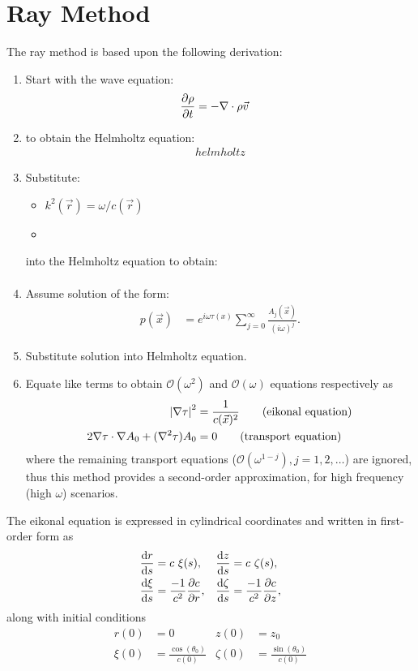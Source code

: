\chapter{Ray Method}
The ray method is based upon the following derivation:
\begin{enumerate}
	\item Start with the wave equation:
	\begin{align}
		\pdv{\rho}{t} &= -\nabla \cdot \rho \vec{v}
	\end{align}

	\item  to obtain the Helmholtz equation:
	\begin{align}
		helmholtz
	\end{align}

	\item Substitute:
	\begin{itemize}
		\item $k^2(\vec{r}) = \omega / c(\vec{r})$
		\item 
	\end{itemize}
	into the Helmholtz equation to obtain:
	\begin{align}
		\tag{TODO}
	\end{align}

	\item Assume solution of the form:
	\begin{align}
		p(\vec{x}) &= e^{i\omega\tau(x)} \sum_{j=0}^\infty \frac{A_j(\vec{x})}{(i\omega)^j}.
	\end{align}

	\item Substitute solution into Helmholtz equation.

	\item Equate like terms to obtain $\mathcal{O}(\omega^2)$ and $\mathcal{O}(\omega)$ equations respectively as
	\begin{align}
		{ \left| {\nabla\tau} \right| }^2 &= \frac{1}{c(\vec{x})^2} \tag{eikonal equation} \\
		2\nabla\tau \cdot \nabla{A_0} + (\nabla^2\tau) A_0 &= 0 \tag{transport equation}
	\end{align}
	where the remaining transport equations ($\mathcal{O}(\omega^{1-j}), j = 1, 2, \dots$) are ignored, thus this method provides a second-order approximation, for high frequency (high $\omega$) scenarios.
\end{enumerate}

The eikonal equation is expressed in cylindrical coordinates and written in first-order form as
\begin{align}
	\dv{r}{s} &= c\ \xi(s), &
	\dv{z}{s} &= c\ \zeta(s), \\
	\dv{\xi}{s} &= \frac{-1}{c^2} \pdv{c}{r}, &
	\dv{\zeta}{s} &= \frac{-1}{c^2} \pdv{c}{z},
\end{align}
along with initial conditions
\begin{align}
	r(0) &= 0 &
	z(0) &= z_0 \\
	\xi(0) &= \frac{\cos(\theta_0)}{c(0)} &
	\zeta(0) &= \frac{\sin(\theta_0)}{c(0)}
\end{align}

